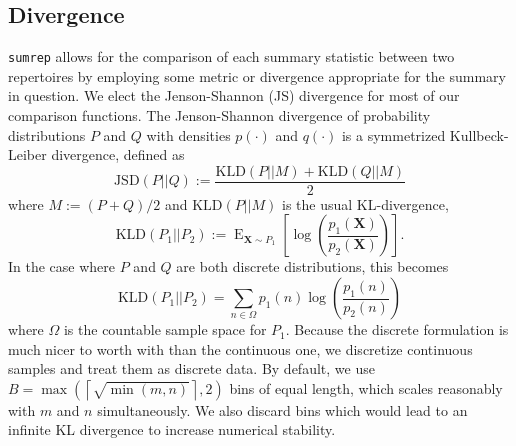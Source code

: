\documentclass{article}
\begin{document}
\subsection*{Divergence}
\texttt{sumrep} allows for the comparison of each summary statistic between two repertoires by employing some metric or divergence appropriate for the summary in question.
We elect the Jenson-Shannon (JS) divergence for most of our comparison functions.
The Jenson-Shannon divergence of probability distributions $P$ and $Q$ with densities $p(\cdot)$ and $q(\cdot)$ is a symmetrized Kullbeck-Leiber divergence, defined as
\begin{equation}
\text{JSD}\left(P || Q\right) := \frac{\text{KLD}\left(P || M\right) + \text{KLD}\left(Q || M\right)}{2}
\end{equation}
where $M := (P + Q)/2$ and $\text{KLD}(P || M)$ is the usual KL-divergence,
\begin{equation}
\text{KLD}\left(P_1 || P_2\right) := \operatorname{E}_{\mathbf X \sim P_1}\left[ \log\left(\frac{p_1(\mathbf X)}{p_2(\mathbf X)}\right) \right].
\end{equation}
In the case where $P$ and $Q$ are both discrete distributions, this becomes
\begin{equation}
\text{KLD}\left(P_1 || P_2\right) = \sum_{n \in \Omega} p_1(n) \log\left( \frac{p_1(n)}{p_2(n)} \right)
\end{equation}
where $\Omega$ is the countable sample space for $P_1$.
Because the discrete formulation is much nicer to worth with than the continuous one, we discretize continuous samples and treat them as discrete data.
By default, we use $B = \max\left(\left\lceil \sqrt{\min(m, n)} \right \rceil, 2\right)$ bins of equal length, which scales reasonably with $m$ and $n$ simultaneously.
We also discard bins which would lead to an infinite KL divergence to increase numerical stability.
\end{document}
